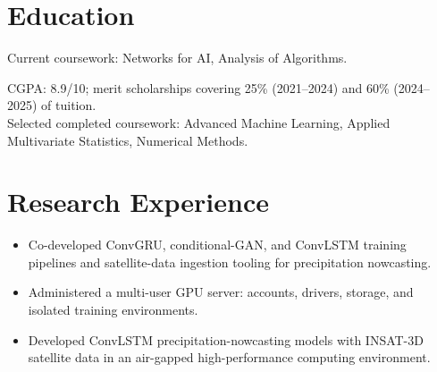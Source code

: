 
\titlespacing{\section}{0pt}{8pt}{3pt}

\resumeheader
\section{Education}
Current coursework: Networks for AI, Analysis of Algorithms.\par
\vspace{3pt}
CGPA: 8.9/10; merit scholarships covering 25\% (2021--2024) and 60\% (2024--2025) of tuition.\\
Selected completed coursework: Advanced Machine Learning, Applied Multivariate Statistics, Numerical Methods.
\section{Research Experience}
\begin{itemize}
  \item Co-developed ConvGRU, conditional-GAN, and ConvLSTM training pipelines and satellite-data ingestion tooling for precipitation nowcasting.
  \item Administered a multi-user GPU server: accounts, drivers, storage, and isolated training environments.
\end{itemize}
\begin{itemize}
  \item Developed ConvLSTM precipitation-nowcasting models with INSAT-3D satellite data in an air-gapped high-performance computing environment.
\end{itemize}
